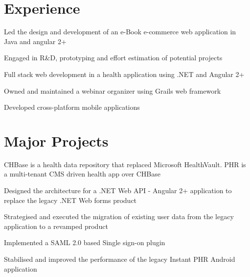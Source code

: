 \documentclass[]{deedy-resume-openfont}
\begin{document}
\begin{minipage}[t]{0.66\textwidth} 


\section{Experience}

\vspace{\topsep} %
\begin{tightemize}
    \item Led the design and development of an e-Book e-commerce web application in Java and angular 2+
    \item Engaged in R\&D, prototyping and effort estimation of potential projects
    \item Full stack web development in a health application using .NET and Angular 2+
    \item Owned and maintained a webinar organizer using Grails web framework 
    \item Developed cross-platform mobile applications
    
\end{tightemize}
\sectionsep


\section{Major Projects}

\begin{tightemize} 
    \item CHBase is a health data repository that replaced Microsoft HealthVault. PHR is a multi-tenant CMS driven health app over CHBase
    \item Designed the architecture for a .NET Web API - Angular 2+ application to replace the legacy .NET Web forms product
    \item Strategised and executed the migration of existing user data from the legacy application to a revamped product
    \item Implemented a SAML 2.0 based Single sign-on plugin
    \item Stabilised and improved the performance of the legacy Instant PHR Android application
\end{tightemize}
\sectionsep


\end{minipage}
\end{document}
